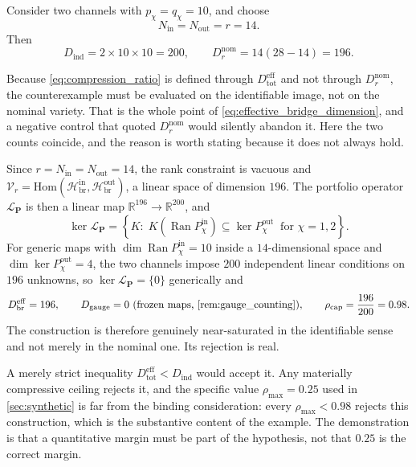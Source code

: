 \documentclass[11pt]{article}
\begin{document}
Consider two channels with \(p_{\chi}=q_{\chi}=10\), and choose
\begin{equation}
N_{\mathrm{in}}=N_{\mathrm{out}}=r=14.
\end{equation}
Then
\begin{equation}
D_{\mathrm{ind}}=2\times10\times10=200,
\qquad
D_r^{\mathrm{nom}}=14(28-14)=196.
\end{equation}

Because \cref{eq:compression_ratio} is defined through \(D_{\mathrm{tot}}^{\mathrm{eff}}\) and not through \(D_r^{\mathrm{nom}}\), the counterexample must be evaluated on the identifiable image, not on the nominal variety. That is the whole point of \cref{eq:effective_bridge_dimension}, and a negative control that quoted \(D_r^{\mathrm{nom}}\) would silently abandon it. Here the two counts coincide, and the reason is worth stating because it does not always hold.

Since \(r=N_{\mathrm{in}}=N_{\mathrm{out}}=14\), the rank constraint is vacuous and \(\mathcal V_{r}=\mathrm{Hom}(\mathcal H_{\mathrm{br}}^{\mathrm{in}},\mathcal H_{\mathrm{br}}^{\mathrm{out}})\), a linear space of dimension \(196\). The portfolio operator \(\mathcal L_{\mathbf P}\) is then a linear map \(\mathbb R^{196}\to\mathbb R^{200}\), and
\begin{equation}
\ker\mathcal L_{\mathbf P}
=\left\{
K:\;
K\!\left(\operatorname{Ran}P_{\chi}^{\mathrm{in}}\right)
\subseteq\ker P_{\chi}^{\mathrm{out}}
\ \text{ for }\chi=1,2
\right\}.
\label{eq:counterexample_kernel}
\end{equation}
For generic maps with \(\dim\operatorname{Ran}P_{\chi}^{\mathrm{in}}=10\) inside a \(14\)-dimensional space and \(\dim\ker P_{\chi}^{\mathrm{out}}=4\), the two channels impose \(200\) independent linear conditions on \(196\) unknowns, so \(\ker\mathcal L_{\mathbf P}=\{0\}\) generically and
\begin{equation}
D_{\mathrm{br}}^{\mathrm{eff}}=196,
\qquad
D_{\mathrm{gauge}}=0
\ \text{(frozen maps, \cref{rem:gauge_counting})},
\qquad
\rho_{\mathrm{cap}}=\frac{196}{200}=0.98.
\end{equation}
The construction is therefore genuinely near-saturated in the identifiable sense and not merely in the nominal one. Its rejection is real.

A merely strict inequality \(D_{\mathrm{tot}}^{\mathrm{eff}}<D_{\mathrm{ind}}\) would accept it. Any materially compressive ceiling rejects it, and the specific value \(\rho_{\max}=0.25\) used in \cref{sec:synthetic} is far from the binding consideration: every \(\rho_{\max}<0.98\) rejects this construction, which is the substantive content of the example. The demonstration is that a quantitative margin must be part of the hypothesis, not that \(0.25\) is the correct margin.
\end{document}
